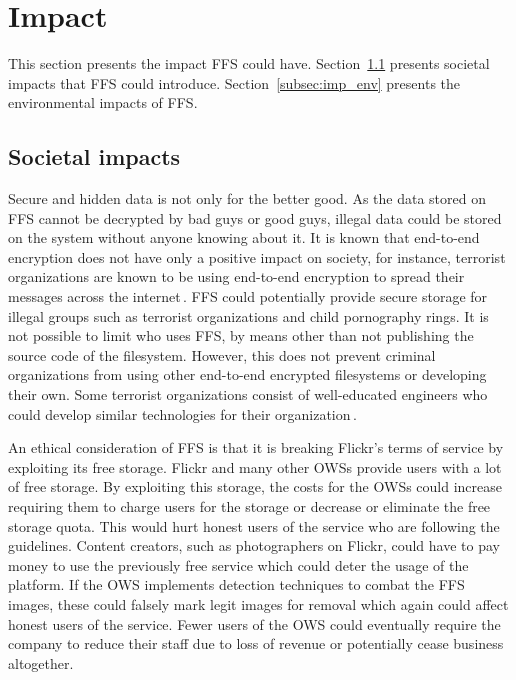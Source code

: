 \section{Impact}
\label{sec:imp}
This section presents the impact \gls{FFS} could have. Section~\ref{subsec:imp_soc} presents societal impacts that \gls{FFS} could introduce. Section~\ref{subsec:imp_env} presents the environmental impacts of \gls{FFS}.

\subsection{Societal impacts}
\label{subsec:imp_soc}
Secure and hidden data is not only for the better good. As the data stored on \gls{FFS} cannot be decrypted by bad guys or good guys, illegal data could be stored on the system without anyone knowing about it. It is known that \mbox{end-to-end} encryption does not have only a positive impact on society, for instance, terrorist organizations are known to be using \mbox{end-to-end} encryption to spread their messages across the internet\,\cite{ruddEncryptionCounterterrorismGetting2017}. \gls{FFS} could potentially provide secure storage for illegal groups such as terrorist organizations and child pornography rings. It is not possible to limit who uses \gls{FFS}, by means other than not publishing the source code of the filesystem. However, this does not prevent criminal organizations from using other \mbox{end-to-end} encrypted filesystems or developing their own. Some terrorist organizations consist of \mbox{well-educated} engineers who could develop similar technologies for their organization\,\cite{berrebyEngineeringTerror2010}.

An ethical consideration of \gls{FFS} is that it is breaking Flickr's terms of service by exploiting its free storage. Flickr and many other \gls{OWS}s provide users with a lot of free storage. By exploiting this storage, the costs for the \glspl{OWS} could increase requiring them to charge users for the storage or decrease or eliminate the free storage quota. This would hurt honest users of the service who are following the guidelines. Content creators, such as photographers on Flickr, could have to pay money to use the previously free service which could deter the usage of the platform. If the \gls{OWS} implements detection techniques to combat the \gls{FFS} images, these could falsely mark legit images for removal which again could affect honest users of the service. Fewer users of the \gls{OWS} could eventually require the company to reduce their staff due to loss of revenue or potentially cease business altogether. 

